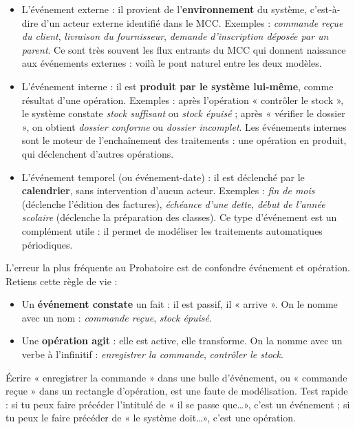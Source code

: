 \documentclass[11pt]{article}
\newcommand{\cle}[1]{{\popxbold\color{popdark}#1}}
\begin{document}
\begin{itemize}
\item L'\cle{événement externe} : il provient de l'\textbf{environnement} du système, c'est-à-dire d'un acteur externe identifié dans le MCC. Exemples : \emph{commande reçue du client}, \emph{livraison du fournisseur}, \emph{demande d'inscription déposée par un parent}. Ce sont très souvent les flux entrants du MCC qui donnent naissance aux événements externes : voilà le pont naturel entre les deux modèles.
\item L'\cle{événement interne} : il est \textbf{produit par le système lui-même}, comme résultat d'une opération. Exemples : après l'opération « contrôler le stock », le système constate \emph{stock suffisant} ou \emph{stock épuisé} ; après « vérifier le dossier », on obtient \emph{dossier conforme} ou \emph{dossier incomplet}. Les événements internes sont le moteur de l'enchaînement des traitements : une opération en produit, qui déclenchent d'autres opérations.
\item L'\cle{événement temporel} (ou événement-date) : il est déclenché par le \textbf{calendrier}, sans intervention d'aucun acteur. Exemples : \emph{fin de mois} (déclenche l'édition des factures), \emph{échéance d'une dette}, \emph{début de l'année scolaire} (déclenche la préparation des classes). Ce type d'événement est un complément utile : il permet de modéliser les traitements automatiques périodiques.
\end{itemize}

\begin{attention}
L'erreur la plus fréquente au Probatoire est de confondre événement et opération. Retiens cette règle de vie :

\begin{itemize}
\item Un \textbf{événement constate} un fait : il est passif, il « arrive ». On le nomme avec un nom : \emph{commande reçue}, \emph{stock épuisé}.
\item Une \textbf{opération agit} : elle est active, elle transforme. On la nomme avec un verbe à l'infinitif : \emph{enregistrer la commande}, \emph{contrôler le stock}.
\end{itemize}

Écrire « enregistrer la commande » dans une bulle d'événement, ou « commande reçue » dans un rectangle d'opération, est une faute de modélisation. Test rapide : si tu peux faire précéder l'intitulé de « il se passe que\ldots », c'est un événement ; si tu peux le faire précéder de « le système doit\ldots », c'est une opération.
\end{attention}
\end{document}
